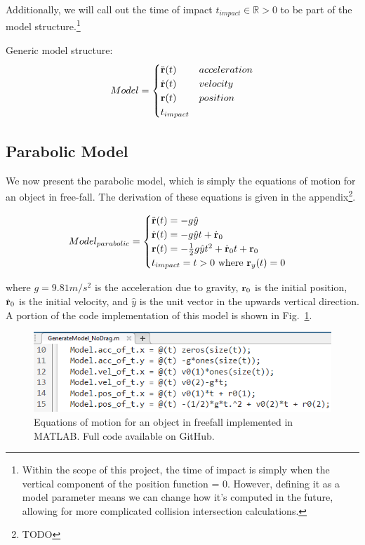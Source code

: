 Additionally, we will call out the time of impact $t_{impact} \in \mathbb{R} > 0$ to be part of the model structure.\footnote{Within the scope of this project, the time of impact is simply when the vertical component of the position function = 0. However, defining it as a model parameter means we can change how it's computed in the future, allowing for more complicated collision intersection calculations.}

Generic model structure:
\begin{align*}
Model =
\begin{cases} 
\ddot{\bf r}(t) & acceleration \\
\dot{\bf r}(t) & velocity \\
{\bf r}(t) & position \\
t_{impact}
\end{cases}
\end{align*}

\subsection{Parabolic Model}
We now present the parabolic model, which is simply the equations of motion for an object in free-fall. The derivation of these equations is given in the appendix\footnote{TODO}.

\begin{align*}
Model_{parabolic} = 
\begin{cases}
\ddot{\bf r}(t) = -g\hat{y} \\
\dot{\bf r}(t) = -g\hat{y}t + \dot{\bf r}_0 \\
{\bf r}(t) = -\frac12g\hat{y}t^2 + \dot{\bf r}_0t + {\bf r}_0 \\
t_{impact} = t > 0\text{ where }{\bf r}_y(t) = 0
\end{cases}
\end{align*}

where $g=9.81m/s^2$ is the acceleration due to gravity, ${\bf r}_0$ is the initial position, $\dot{\bf r}_0$ is the initial velocity, and $\hat{y}$ is the unit vector in the upwards vertical direction. A portion of the code implementation of this model is shown in Fig.~\ref{fig:model_matlab_code_nodrag}.

\begin{figure}[t]
\centering
\includegraphics[width=0.75\linewidth]{images/model_matlab_code_nodrag.png}
\caption{\label{fig:model_matlab_code_nodrag} Equations of motion for an object in freefall implemented in MATLAB. Full code available on GitHub.}
\end{figure}






